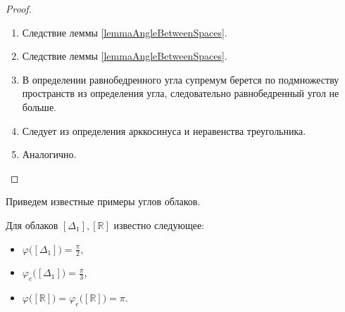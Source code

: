 \begin{proof}
  \begin{enumerate}
    \item Следствие леммы \ref{lemmaAngleBetweenSpaces}.
    \item Следствие леммы \ref{lemmaAngleBetweenSpaces}.
    \item В определении равнобедренного угла супремум берется по
      подмножеству пространств из определения угла, следовательно
      равнобедренный угол не больше.
    \item Следует из определения арккосинуса и неравенства треугольника.
    \item Аналогично.
  \end{enumerate}
\end{proof}
Приведем известные примеры углов облаков.
\begin{HYP}
  Для облаков \( [\Delta _{1}], [\mathbb{R}] \) известно следующее:
  \begin{itemize}
    \item \( \varphi \big([\Delta _{1}]\big) = \frac{\pi }{2} \),
    \item \( \varphi_e \big([\Delta _{1}]\big) = \frac{\pi }{3} \),
    \item \( \varphi \big([\mathbb{R}]\big) = \varphi_e
      \big([\mathbb{R}]\big) = \pi  \).
  \end{itemize}
\end{HYP}
